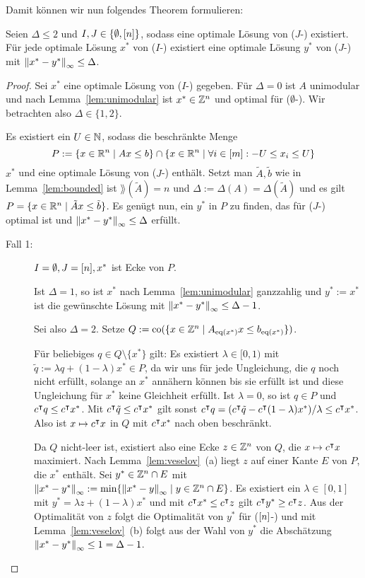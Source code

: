 Damit können wir nun folgendes Theorem formulieren:
\begin{theorem}
		Seien $\Delta\leq 2$ und $I,J\in\{\emptyset,[n]\}$, sodass eine optimale Lösung von ($J$-\MIPI) existiert.
		Für jede optimale Lösung $x^*$ von ($I$-\MIPI) existiert eine optimale Lösung $y^*$ von ($J$-\MIPI) mit $\left\lVert x^*-y^*\right\rVert_\infty\leq \Delta$.
\end{theorem}
\begin{proof}
	Sei $x^*$ eine optimale Lösung von ($I$-\MIPI) gegeben.
	Für $\Delta=0$ ist $A$ unimodular und nach Lemma~\ref{lem:unimodular} ist $x^*\in\mathbb{Z}^n$ und optimal für ($\emptyset$-\MIPI).
	Wir betrachten also $\Delta\in\{1,2\}$.
	
	Es existiert ein $U\in\mathbb{N}$, sodass die beschränkte Menge  $$P:=\{x\in\mathbb{R}^n\mid Ax\leq b\} \cap \{x\in\mathbb{R}^n \mid \forall i\in[m]: -U \leq x_i \leq U \}$$
	$x^*$ und eine optimale Lösung von ($J$-\MIPI) enthält.
	Setzt man $\tilde{A},\tilde{b}$ wie in Lemma~\ref{lem:bounded} ist $\rang(\tilde{A})=n$ und $\Delta:=\Delta(A)=\Delta(\tilde{A})$ und es gilt $P=\{ x\in\mathbb{R}^n \mid \tilde{A}x \leq \tilde{b} \}$.
	Es genügt nun, ein $y^*$ in $P$ zu finden, das für ($J$-\MIPI) optimal ist und $\left\lVert x^* - y^*\right\rVert_\infty\leq\Delta$ erfüllt.
	
	\begin{description}
		\item[Fall 1:]  $I=\emptyset,J=[n], x^*$ ist Ecke von $P$.
		
		Ist $\Delta= 1$, so ist $x^*$ nach Lemma~\ref{lem:unimodular} ganzzahlig und $y^* := x^*$ ist die gewünschte Lösung mit $\left\lVert x^*-y^*\right\rVert_\infty\leq \Delta - 1$.
		
		Sei also $\Delta=2$. Setze $Q:=\operatorname{co}(\{x\in\mathbb{Z}^n \mid A_{\operatorname{eq}(x^*)}x \leq b_{\operatorname{eq}(x^*)} \})$.
		
		Für beliebiges $q\in Q\setminus\{x^*\}$ gilt:
		Es existiert $\lambda\in[0,1)$ mit $\tilde{q}:=\lambda q+(1-\lambda)x^*\in P$, da wir uns für jede Ungleichung, die $q$ noch nicht erfüllt, solange an $x^*$ annähern können bis sie erfüllt ist und diese Ungleichung für $x^*$ keine Gleichheit erfüllt.
		Ist $\lambda=0$, so ist $q\in P$ und $c^\intercal q\leq c^\intercal x^*$. Mit $c^\intercal \tilde{q} \leq c^\intercal x^*$ gilt sonst $c^\intercal q=(c^\intercal \tilde{q} - c^\intercal(1-\lambda)x^*)/\lambda \leq c^\intercal x^*$.
		Also ist $x\mapsto c^\intercal x$ in $Q$ mit $c^\intercal x^*$ nach oben beschränkt.
		
		
		Da $Q$ nicht-leer ist, existiert also eine Ecke $z\in\mathbb{Z}^n$ von $Q$, die $x\mapsto c^\intercal x$ maximiert.
		Nach Lemma~\ref{lem:veselov}~(a) liegt $z$ auf einer Kante $E$ von $P$, die $x^*$ enthält.
		Sei $y^*\in\mathbb{Z}^n\cap E$ mit $\left\lVert x^* - y^*\right\rVert_\infty := \min\{ \left\lVert x^*-y\right\rVert_\infty \mid y\in\mathbb{Z}^n\cap E  \}$.
		Es existiert ein $\lambda\in [0,1]$ mit $y^* = \lambda z + (1-\lambda)x^*$ und mit $c^\intercal x^* \leq c^\intercal z$ gilt $c^\intercal y^* \geq c^\intercal z$.
		Aus der Optimalität von $z$ folgt die Optimalität von $y^*$ für ($[n]$-\MIPI) und mit Lemma~\ref{lem:veselov}~(b) folgt aus der Wahl von $y^*$ die Abschätzung $\left\lVert x^*-y^*\right\rVert_\infty\leq 1=\Delta-1$.


\end{description}
\end{proof}
